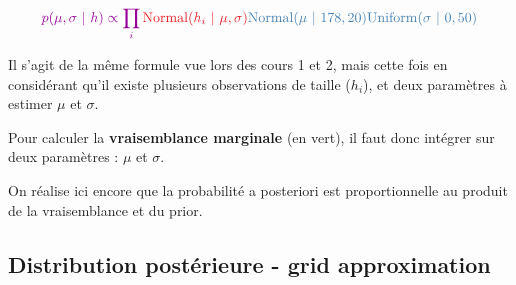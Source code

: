 \documentclass[
  a4paper,11pt,twoside,onecolumn,openright,final,oldfontcommands]{memoir}
\theoremstyle{definition}
\theoremstyle{definition}
\theoremstyle{definition}
\theoremstyle{definition}
\theoremstyle{remark}
\begin{document}
\[
\color{purple}{p(\mu, \sigma \ | \ h)} \propto \prod_{i} \color{orangered}{\mathrm{Normal}(h_{i} \ | \ \mu, \sigma)}\color{steelblue}{\mathrm{Normal}(\mu \ | \ 178, 20)\mathrm{Uniform}(\sigma \ | \ 0, 50)}
\]

Il s'agit de la même formule vue lors des cours 1 et 2, mais cette fois en considérant qu'il existe plusieurs observations de taille (\(h_{i}\)), et deux paramètres à estimer \(\mu\) et \(\sigma\).

Pour calculer la \textbf{vraisemblance marginale} (en vert), il faut donc intégrer sur deux paramètres : \(\mu\) et \(\sigma\).

On réalise ici encore que la probabilité a posteriori est proportionnelle au produit de la vraisemblance et du prior.

\hypertarget{distribution-postuxe9rieure---grid-approximation}{%
\subsection{Distribution postérieure - grid approximation}\label{distribution-postuxe9rieure---grid-approximation}}
\end{document}

